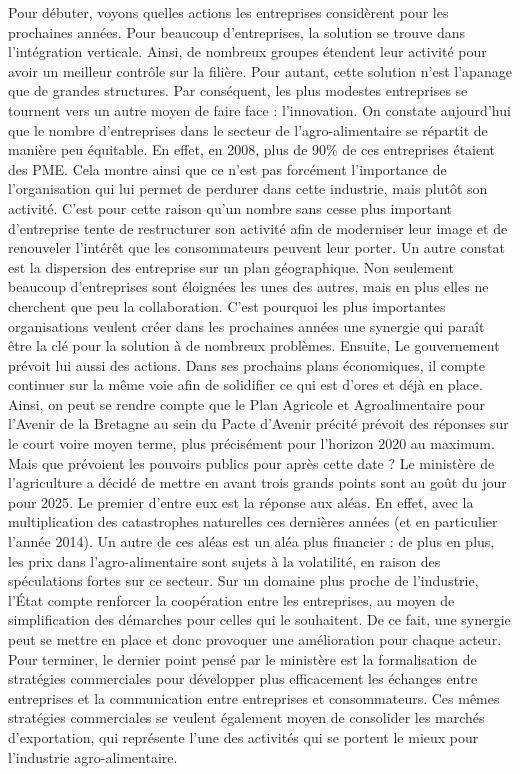 \documentclass[a4paper,10pt]{report}
\begin{document}
			Pour débuter, voyons quelles actions les entreprises considèrent pour les prochaines années. Pour beaucoup d’entreprises, la solution se trouve dans l’intégration verticale. Ainsi, de nombreux groupes étendent leur activité pour avoir un meilleur contrôle sur la filière. Pour autant, cette solution n’est l’apanage que de grandes structures. Par conséquent, les plus modestes entreprises se tournent vers un autre moyen de faire face : l’innovation. On constate aujourd’hui que le nombre d’entreprises dans le secteur de l’agro-alimentaire se répartit de manière peu équitable. En effet, en 2008, plus de 90\% de ces entreprises étaient des PME\cite{IAAFranceChiffres}. Cela montre ainsi que ce n’est pas forcément l’importance de l’organisation qui lui permet de perdurer dans cette industrie, mais plutôt son activité. C’est pour cette raison qu’un nombre sans cesse plus important d’entreprise tente de restructurer son activité afin de moderniser leur image et de renouveler l’intérêt que les consommateurs peuvent leur porter. Un autre constat est la dispersion des entreprise sur un plan géographique. Non seulement beaucoup d’entreprises sont éloignées les unes des autres, mais en plus elles ne cherchent que peu la collaboration. C’est pourquoi les plus importantes organisations veulent créer dans les prochaines années une synergie qui paraît être la clé pour la solution à de nombreux problèmes.
			Ensuite, Le gouvernement prévoit lui aussi des actions. Dans ses prochains plans économiques, il compte continuer sur la même voie afin de solidifier ce qui est d’ores et déjà en place. Ainsi, on peut se rendre compte que le Plan Agricole et Agroalimentaire pour l’Avenir de la Bretagne au sein du Pacte d’Avenir précité prévoit des réponses sur le court voire moyen terme, plus précisément pour l’horizon 2020 au maximum. Mais que prévoient les pouvoirs publics pour après cette date ? Le ministère de l’agriculture a décidé de mettre en avant trois grands points sont au goût du jour pour 2025\cite{AvenirFiliereAgricole2025}. Le premier d’entre eux est la réponse aux aléas. En effet, avec la multiplication des catastrophes naturelles ces dernières années (et en particulier l’année 2014). Un autre de ces aléas est un aléa plus financier : de plus en plus, les prix dans l’agro-alimentaire sont sujets à la volatilité, en raison des spéculations fortes sur ce secteur. Sur un domaine plus proche de l’industrie, l’État compte renforcer la coopération entre les entreprises, au moyen de simplification des démarches pour celles qui le souhaitent. De ce fait, une synergie peut se mettre en place et donc provoquer une amélioration pour chaque acteur. Pour terminer, le dernier point pensé par le ministère est la formalisation de stratégies commerciales pour développer plus efficacement les échanges entre entreprises et la communication entre entreprises et consommateurs. Ces mêmes stratégies commerciales se veulent également moyen de consolider les marchés d’exportation, qui représente l’une des activités qui se portent le mieux pour l’industrie agro-alimentaire.
			
\end{document}
